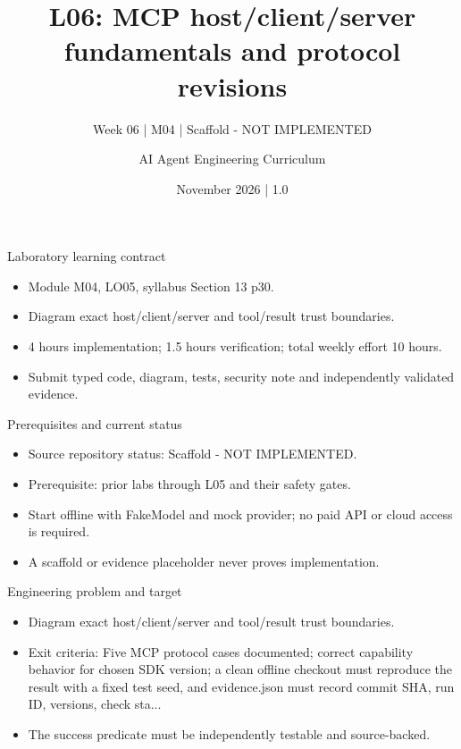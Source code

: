 \documentclass[aspectratio=169,10pt]{beamer}
\title[L06 - Agent Engineering]{L06: MCP host/client/server fundamentals and protocol revisions}
\subtitle{Week 06 | M04 | Scaffold - NOT IMPLEMENTED}
\author{AI Agent Engineering Curriculum}
\date{November 2026 | 1.0}
\begin{document}
\begin{frame}\titlepage\end{frame}

\begin{frame}{Laboratory learning contract}
\small
\begin{itemize}
\item Module M04, LO05, syllabus Section 13 p30.
\item Diagram exact host/client/server and tool/result trust boundaries.
\item 4 hours implementation; 1.5 hours verification; total weekly effort 10 hours.
\item Submit typed code, diagram, tests, security note and independently validated evidence.
\end{itemize}

\end{frame}

\begin{frame}{Prerequisites and current status}
\small
\begin{itemize}
\item Source repository status: Scaffold - NOT IMPLEMENTED.
\item Prerequisite: prior labs through L05 and their safety gates.
\item Start offline with FakeModel and mock provider; no paid API or cloud access is required.
\item A scaffold or evidence placeholder never proves implementation.
\end{itemize}

\end{frame}

\begin{frame}{Engineering problem and target}
\small
\begin{itemize}
\item Diagram exact host/client/server and tool/result trust boundaries.
\item Exit criteria: Five MCP protocol cases documented; correct capability behavior for chosen SDK version; a clean offline checkout must reproduce the result with a fixed test seed, and evidence.json must record commit SHA, run ID, versions, check sta...
\item The success predicate must be independently testable and source-backed.
\end{itemize}

\end{frame}
\end{document}
